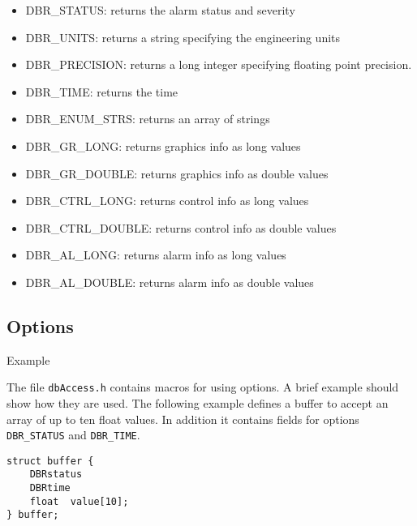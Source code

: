 \begin{itemize}

\item {}DBR\_STATUS: returns the alarm status and severity

\item {}DBR\_UNITS: returns a string specifying the engineering units

\item {}DBR\_PRECISION: returns a long integer specifying floating point precision.

\item {}DBR\_TIME: returns the time

\item {}DBR\_ENUM\_STRS: returns an array of strings

\item {}DBR\_GR\_LONG: returns graphics info as long values

\item {}DBR\_GR\_DOUBLE: returns graphics info as double values

\item {}DBR\_CTRL\_LONG: returns control info as long values

\item {}DBR\_CTRL\_DOUBLE: returns control info as double values

\item {}DBR\_AL\_LONG: returns alarm info as long values

\item {}DBR\_AL\_DOUBLE: returns alarm info as double values

\end{itemize}

\subsection{Options}

Example

The file \verb|dbAccess.h| contains macros for using options.
A brief example should show how they are used.
The following example defines a buffer to accept an array of up to ten float values.
In addition it contains fields for options \verb|DBR_STATUS| and \verb|DBR_TIME|.

\begin{verbatim}
struct buffer {
    DBRstatus
    DBRtime
    float  value[10];
} buffer;
\end{verbatim}

